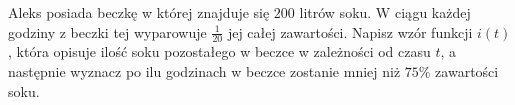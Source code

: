 Aleks posiada beczkę w której znajduje się $200$ litrów soku. W ciągu każdej godziny z beczki tej wyparowuje $\frac{1}{20}$ jej całej zawartości. Napisz wzór funkcji $i(t)$, która opisuje ilość soku pozostałego w beczce w zależności od czasu $t$, a następnie wyznacz po ilu godzinach w beczce zostanie mniej niż $75\%$ zawartości soku.